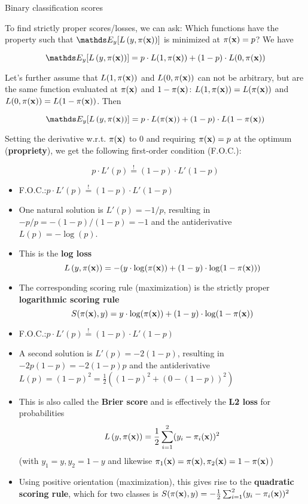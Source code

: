 \documentclass[11pt,compress,t,notes=noshow, xcolor=table]{beamer}
\begin{document}
\begin{vbframe}{Binary classification scores}

To find strictly proper scores/losses, we can ask: Which functions have the property such that $\E_y[\Lpixy]$ is minimized at $\pi(\mathbf{x})=p$? We have

$$\E_{y}[\Lpixy]=p \cdot L(1,\pix) + (1-p) \cdot L(0,\pix)$$

Let's further %
assume that $L(1,\pi(\mathbf{x}))$ and $L(0, \pi(\mathbf{x}))$ can not be arbitrary, but are the same function evaluated at $\pi(\mathbf{x})$ and $1-\pi(\mathbf{x})$:
$L(1,\pi(\mathbf{x}))=L(\pi(\mathbf{x}))$ and $L(0,\pi(\mathbf{x}))=L(1-\pi(\mathbf{x}))$. Then

$$\E_{y}[\Lpixy]=p \cdot L(\pix) + (1-p) \cdot L(1-\pix)$$

\vspace{0.2cm}

Setting the derivative w.r.t. $\pi(\mathbf{x})$ to $0$ and requiring $\pi(\mathbf{x})=p$ at the optimum (\textbf{propriety}), we get the following first-order condition (F.O.C.):

\vspace{0.3cm}

$$p \cdot L'(p) \overset{!}{=} (1-p) \cdot L'(1-p)$$

\framebreak

\begin{itemize}\setlength\itemsep{1.9em}
    \item F.O.C.:\quad $p \cdot L'(p) \overset{!}{=} (1-p) \cdot L'(1-p)$
    \item One natural solution is $L'(p)=-1/p$, resulting in $-p/p=-(1-p)/(1-p)=-1$ and the antiderivative $L(p)=-\log(p)$. 
    \item This is the \textbf{log loss} $$L\left(y, \pi(\mathbf{x})\right)=-(y \cdot \log(\pi(\mathbf{x})) + (1-y) \cdot \log(1-\pi(\mathbf{x})))$$
    \item The corresponding scoring rule (maximization) is the strictly proper \textbf{logarithmic scoring rule} $$S(\pi(\mathbf{x}),y)=y \cdot \log(\pi(\mathbf{x})) + (1-y) \cdot \log(1-\pi(\mathbf{x}))$$
\end{itemize}

\framebreak

\begin{itemize} \setlength\itemsep{1.2em}
    \item F.O.C.:\quad $p \cdot L'(p) \overset{!}{=} (1-p) \cdot L'(1-p)$
    \item A second solution is $L'(p)=-2(1-p)$, resulting in $-2p(1-p)=-2(1-p)p$ and the antiderivative $L(p)=(1-p)^2=\frac{1}{2}((1-p)^2+(0-(1-p))^2)$
    \item This is also called the \textbf{Brier score} and is effectively the \textbf{L2 loss} for probabilities $$L\left(y, \pi(\mathbf{x})\right)=\frac{1}{2}\sum_{i=1}^{2}(y_i-\pi_i(\mathbf{x}))^2$$
     {\small (with $y_1=y, y_2=1-y$ and likewise $\pi_1(\mathbf{x})=\pi(\mathbf{x}), \pi_2(\mathbf{x})=1-\pi(\mathbf{x})$)}
    \item Using positive orientation (maximization), this gives rise to the \textbf{quadratic scoring rule}, which for two classes is $S(\pi(\mathbf{x}),y)=-\frac{1}{2} \sum_{i=1}^{2}(y_i-\pi_i(\mathbf{x}))^2$
\end{itemize}

\end{vbframe}



\endlecture
\end{document}
